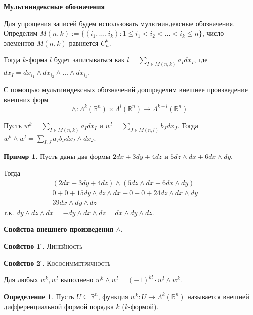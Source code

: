 \documentclass[a5paper]{article}
\newcounter{through}
\theoremstyle{plain}
\theoremstyle{definition}
\newtheorem{definition}[through]{Определение}
\newtheorem{example}[through]{Пример}
\numberwithin{through}{section}
\numberwithin{equation}{section}
\begin{document}
\textbf{Мультииндексные обозначения}

Для упрощения записей будем использовать мультииндексные обозначения.
Определим $M(n,k) := \{ (i_1,\ldots,i_k): 1\leq i_1 < i_2 < \ldots < i_k \leq n \}$, число элементов
$M(n,k)$ равняется $C_n^k$.

Тогда $k$-форма $l$ будет записываться как $l = \sum\limits_{I \in M(n,k)} a_I dx_I$,
где $dx_I = dx_{i_{1}} \wedge dx_{i_{2}} \wedge\ldots\wedge dx_{i_{k}}$.

С помощью мультииндексных обозначений доопределим
внешнее произведение внешних форм
\[ \wedge : \Lambda^k(\mathbb{R}^n) \times 
\Lambda^l(\mathbb{R}^n) \to \Lambda^{k+l}(\mathbb{R}^n) \]

Пусть $w^k = \sum\limits_{I \in M(n,k)} a_I dx_I$ и 
$w^l = \sum\limits_{J \in M(n,l)} b_J dx_J$. Тогда
$ w^k \wedge w^l = \sum\limits_{I,J} a_Ib_J dx_I \wedge dx_J$.

\begin{example}
	Пусть даны две формы 
	$2dx+3dy+4dz$ и $5dz\wedge dx + 6dx\wedge dy$. 
	
	Тогда
	\begin{eqnarray}\nonumber
		(2dx+3dy+4dz)\wedge (5dz\wedge dx + 6dx\wedge dy) =
		\\\nonumber 0 + 0 + 15dy \wedge dz \wedge dx + 0 + 0 + 24dz \wedge dx \wedge dy  = 
		\\\nonumber 39dx \wedge dy \wedge dz 
	\end{eqnarray} т.к.
	$ dy \wedge dz \wedge dx = - dy \wedge dx \wedge dz = dx \wedge dy \wedge dz$.
\end{example}

{\bf Свойства внешнего произведения $\wedge$.}

\medskip
{\bf Свойство} $\mathbf{1^\circ.}$
{\textsc{Линейность}}

\medskip
{\bf Свойство} $\mathbf{2^\circ.}$
{\textsc{Кососимметричность}}

Для любых $w^k, w^l$ выполнено $w^k \wedge w^l = 
(-1)^{kl} \cdot w^l \wedge w^k$.

\begin{definition}
	Пусть $U \subseteq \mathbb{R}^n$, функция
	$w^k: U \to \Lambda^k(\mathbb{R}^n)$ называется внешней дифференциальной формой порядка $k$ ($k$-формой).
\end{definition}
\end{document}
